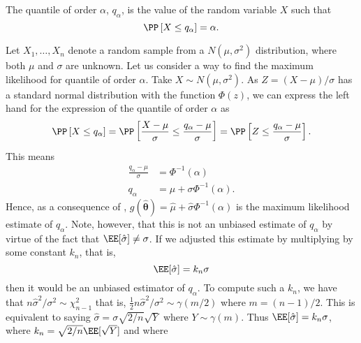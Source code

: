 \begin{defe} \label{defe: quant_ord}
    The quantile of order $\alpha$, $q_{\alpha}$, is the value of the random variable $X$ such that
    \begin{equation*}
        \PP \left[ X \leq q_{\alpha} \right] = \alpha.
    \end{equation*}
\end{defe}

\begin{exam}
    Let $X_1 , \ldots , X_n$ denote a random sample from a $N (\mu , \sigma^2)$ distribution, where both $\mu$ and $\sigma$ are unknown. Let us consider a way to find the maximum likelihood for quantile of order $\alpha$. Take $X \sim N \left( \mu , \sigma^2 \right)$. As $Z = (X  - \mu) / \sigma$ has a standard normal distribution with the function $\Phi (z)$, we can express the left hand for the expression of the quantile of order $\alpha$ as
    \begin{equation*}
        \PP \left[ X \leq q_{\alpha} \right] = \PP \left[ \frac{X - \mu}{\sigma} \leq \frac{q_{\alpha} - \mu}{\sigma} \right] = \PP \left[ Z \leq \frac{q_{\alpha} - \mu}{\sigma} \right].
    \end{equation*}
    This means
    \begin{align*}
        \frac{q_{\alpha} - \mu}{\sigma} & = \Phi^{-1} (\alpha)               \\
        q_{\alpha}                      & = \mu + \sigma \Phi^{-1} (\alpha).
    \end{align*}
    Hence, as a consequence of , $g(\hat{\bm{\theta}}) = \hat{\mu} + \hat{\sigma} \Phi^{-1} (\alpha)$ is the maximum likelihood estimate of $q_{\alpha}$. Note, however, that this is not an unbiased estimate of $q_{\alpha}$ by virtue of the fact that $\EE [\hat{\sigma}] \neq \sigma$. If we adjusted this estimate by multiplying by some constant $k_n$, that is,
    \begin{equation*}
        \EE [\hat{\sigma}] = k_n \sigma
    \end{equation*}
    then it would be an unbiased estimator of $q_{\alpha}$. To compute such a $k_n$, we have that $n \hat{\sigma}^2 / \sigma^2 \sim \chi_{n-1}^2$ that is, $\frac{1}{2} n \hat{\sigma}^2 / \sigma^2 \sim \gamma (m/2)$ where $m = (n-1)/2$. This is equivalent to saying $\hat{\sigma} = \sigma \sqrt{2/n} \sqrt{Y}$ where $Y \sim \gamma (m)$. Thus $\EE [\hat{\sigma}] = k_n \sigma$, where $k_n = \sqrt{2/n} \EE [\sqrt{Y}]$ and where
    \begin{align*}

\end{align*}
\end{exam}
